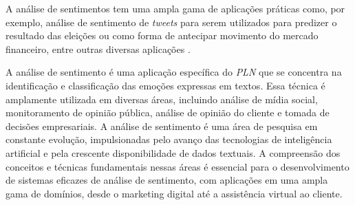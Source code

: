 
A análise de sentimentos tem uma ampla gama de aplicações práticas como, por exemplo, análise de sentimento de \textit{tweets} para serem utilizados para predizer o resultado das eleições ou como forma de antecipar movimento do mercado financeiro, entre outras diversas aplicações \cite{Liu2012}.

A análise de sentimento é uma aplicação específica do \textit{PLN} que se concentra na identificação e classificação das emoções expressas em textos. Essa técnica é amplamente utilizada em diversas áreas, incluindo análise de mídia social, monitoramento de opinião pública, análise de opinião do cliente e tomada de decisões empresariais. A análise de sentimento é uma área de pesquisa em constante evolução, impulsionadas pelo avanço das tecnologias de inteligência artificial e pela crescente disponibilidade de dados textuais. A compreensão dos conceitos e técnicas fundamentais nessas áreas é essencial para o desenvolvimento de sistemas eficazes de análise de sentimento, com aplicações em uma ampla gama de domínios, desde o marketing digital até a assistência virtual ao cliente.




